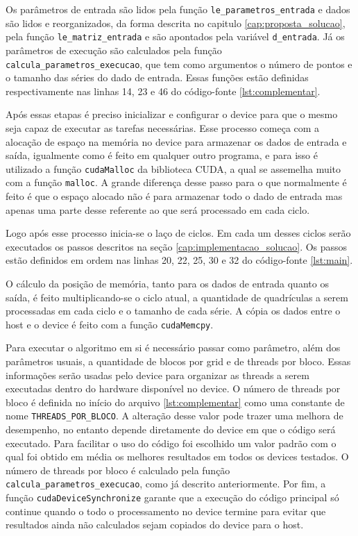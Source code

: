 Os parâmetros de entrada são lidos pela função \texttt{le\_parametros\_entrada} e dados são lidos e reorganizados, da forma descrita no capitulo \ref{cap:proposta_solucao}, pela função \texttt{le\_matriz\_entrada} e são apontados pela variável \texttt{d\_entrada}. Já os parâmetros de execução são calculados pela função \texttt{calcula\_parametros\_execucao}, que tem como argumentos o número de pontos e o tamanho das séries do dado de entrada. Essas funções estão definidas respectivamente nas linhas 14, 23 e 46 do código-fonte \ref{lst:complementar}.

Após essas etapas é preciso inicializar e configurar o device para que o mesmo seja capaz de executar as tarefas necessárias. Esse processo começa com a alocação de espaço na memória no device para armazenar os dados de entrada e saída, igualmente como é feito em qualquer outro programa, e para isso é utilizado a função \texttt{cudaMalloc} da biblioteca CUDA, a qual se assemelha muito com a função \texttt{malloc}. A grande diferença desse passo para o que normalmente é feito é que o espaço alocado não é para armazenar todo o dado de entrada mas apenas uma parte desse referente ao que será processado em cada ciclo.

Logo após esse processo inicia-se o laço de ciclos. Em cada um desses ciclos serão executados os passos descritos na seção \ref{cap:implementacao_solucao}. Os passos estão definidos em ordem nas linhas 20, 22, 25, 30 e 32 do código-fonte \ref{lst:main}.



O cálculo da posição de memória, tanto para os dados de entrada quanto os saída, é feito multiplicando-se o ciclo atual, a quantidade de quadrículas a serem processadas em cada ciclo e o tamanho de cada série. A cópia os dados entre o host e o device é feito com a função \texttt{cudaMemcpy}.

Para executar o algoritmo em si é necessário passar como parâmetro, além dos parâmetros usuais, a quantidade de blocos por grid e de threads por bloco. Essas informações serão usadas pelo device para organizar as threads a serem executadas dentro do hardware disponível no device. O número de threads por bloco é definida no início do arquivo \ref{lst:complementar} como uma constante de nome \texttt{THREADS\_POR\_BLOCO}. A alteração desse valor pode trazer uma melhora de desempenho, no entanto depende diretamente do device em que o código será executado. Para facilitar o uso do código foi escolhido um valor padrão com o qual foi obtido em média os melhores resultados em todos os devices testados. O número de threads por bloco é calculado pela função \texttt{calcula\_parametros\_execucao}, como já descrito anteriormente. Por fim, a função \texttt{cudaDeviceSynchronize} garante que a execução do código principal só continue quando o todo o processamento no device termine para evitar que resultados ainda não calculados sejam copiados do device para o host.

